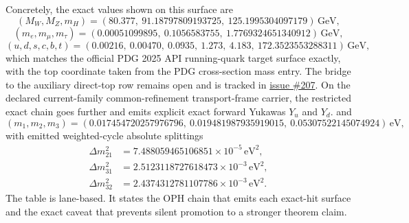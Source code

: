 \documentclass[11pt]{article}
\begin{document}
Concretely, the exact values shown on this surface are
\[
(M_W,M_Z,m_H)=
(80.377,\ 91.18797809193725,\ 125.1995304097179)\,\mathrm{GeV},
\]
\[
(m_e,m_\mu,m_\tau)=
(0.00051099895,\ 0.1056583755,\ 1.7769324651340912)\,\mathrm{GeV},
\]
\[
(u,d,s,c,b,t)=
(0.00216,\ 0.00470,\ 0.0935,\ 1.273,\ 4.183,\ 172.3523553288311)\,\mathrm{GeV},
\]
which matches the official PDG 2025 API running-quark target surface exactly, with the top coordinate taken from the PDG cross-section mass entry. The bridge to the auxiliary direct-top row remains open and is tracked in \href{https://github.com/FloatingPragma/observer-patch-holography/issues/207}{issue \#207}. On the declared current-family common-refinement transport-frame carrier, the restricted exact chain goes further and emits explicit exact forward Yukawas \(Y_u\) and \(Y_d\).
and
\[
(m_1,m_2,m_3)=
(0.017454720257976796,\ 0.019481987935919015,\ 0.05307522145074924)\,\mathrm{eV},
\]
with emitted weighted-cycle absolute splittings
\[
\begin{aligned}
\Delta m_{21}^2&=7.488059465106851\times10^{-5}\,\mathrm{eV}^2,\\
\Delta m_{31}^2&=2.5123118727618473\times10^{-3}\,\mathrm{eV}^2,\\
\Delta m_{32}^2&=2.4374312781107786\times10^{-3}\,\mathrm{eV}^2.
\end{aligned}
\]
The table is lane-based. It states the OPH chain that emits each exact-hit surface and the exact caveat that prevents silent promotion to a stronger theorem claim.
\end{document}
